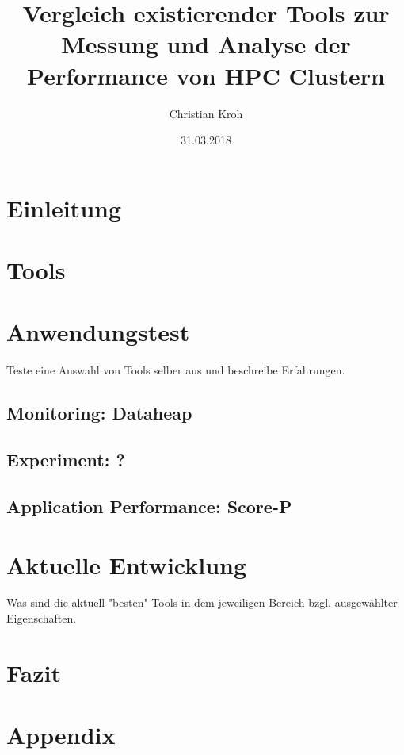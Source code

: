 \documentclass[german,beleg,zihtitle,hyperref,utf8]{zihpub}
\title{Vergleich existierender Tools zur Messung und Analyse der Performance von HPC Clustern}
\author{Christian Kroh}
\date{31.03.2018}
\begin{document}
\chapter{Einleitung}



\chapter{Tools}


\chapter{Anwendungstest}
Teste eine Auswahl von Tools selber aus und beschreibe Erfahrungen.
\section{Monitoring: Dataheap}


\section{Experiment: ?}

\section{Application Performance: Score-P}


\chapter{Aktuelle Entwicklung}
Was sind die aktuell "besten" Tools in dem jeweiligen Bereich bzgl. ausgewählter Eigenschaften.

\chapter{Fazit}



\chapter*{Appendix}
\addtocounter{chapter}{1}
%
\end{document}
